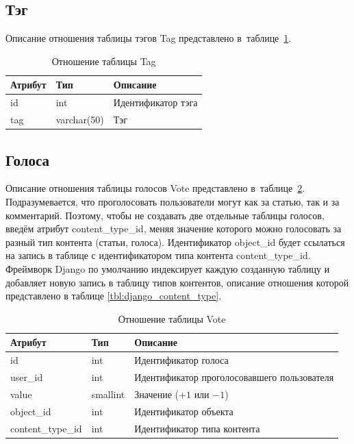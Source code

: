 \subsection{Тэг}

Описание отношения таблицы тэгов Tag представлено в~таблице~\ref{tbl:myblog_tag}.

\begin{table}[H]
	\centering
	\caption{Отношение таблицы Tag}
	\label{tbl:myblog_tag}
	\begin{tabular}{|l|l|l|}
		\hline
		\textbf{Атрибут} & \textbf{Тип} & \textbf{Описание}  \\ \hline
		id               & int          & Идентификатор тэга \\ \hline
		tag              & varchar(50)  & Тэг                \\ \hline
	\end{tabular}
\end{table}

\subsection{Голоса}

Описание отношения таблицы голосов Vote представлено в~таблице~\ref{tbl:myblog_vote}.
Подразумевается, что проголосовать пользователи могут как за статью, так и за комментарий.
Поэтому, чтобы не создавать две отдельные таблицы голосов, введём атрибут content\_type\_id, меняя значение которого можно голосовать за разный тип контента (статьи, голоса).
Идентификатор object\_id будет ссылаться на запись в таблице с идентификатором типа контента content\_type\_id.
Фреймворк Django по умолчанию индексирует каждую созданную таблицу и добавляет новую запись в таблицу типов контентов, описание отношения которой представлено в таблице \ref{tbl:django_content_type}.

\begin{table}[H]
	\centering
	\caption{Отношение таблицы Vote}
	\label{tbl:myblog_vote}
	\begin{tabular}{|l|l|l|}
		\hline
		\textbf{Атрибут}  & \textbf{Тип} & \textbf{Описание}                           \\ \hline
		id                & int          & Идентификатор голоса                        \\ \hline
		user\_id          & int          & Идентификатор проголосовавшего пользователя \\ \hline
		value             & smallint     & Значение ($+1$ или $-1$)                    \\ \hline
		object\_id        & int          & Идентификатор объекта                       \\ \hline
		content\_type\_id & int          & Идентификатор типа контента                 \\ \hline
	\end{tabular}
\end{table}


